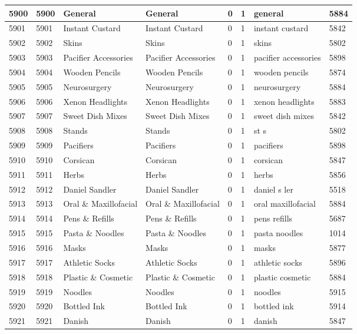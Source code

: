 \begin{longtable}{|l|l|l|l|l|l|l|l|}
5900 & 5900 & General & General & 0 & 1 & general & 5884 \\ \hline 
5901 & 5901 & Instant Custard & Instant Custard & 0 & 1 & instant custard & 5842 \\ \hline 
5902 & 5902 & Skins & Skins & 0 & 1 & skins & 5802 \\ \hline 
5903 & 5903 & Pacifier Accessories & Pacifier Accessories & 0 & 1 & pacifier accessories & 5898 \\ \hline 
5904 & 5904 & Wooden Pencils & Wooden Pencils & 0 & 1 & wooden pencils & 5874 \\ \hline 
5905 & 5905 & Neurosurgery & Neurosurgery & 0 & 1 & neurosurgery & 5884 \\ \hline 
5906 & 5906 & Xenon Headlights & Xenon Headlights & 0 & 1 & xenon headlights & 5883 \\ \hline 
5907 & 5907 & Sweet Dish Mixes & Sweet Dish Mixes & 0 & 1 & sweet dish mixes & 5842 \\ \hline 
5908 & 5908 & Stands & Stands & 0 & 1 & st s & 5802 \\ \hline 
5909 & 5909 & Pacifiers & Pacifiers & 0 & 1 & pacifiers & 5898 \\ \hline 
5910 & 5910 & Corsican & Corsican & 0 & 1 & corsican & 5847 \\ \hline 
5911 & 5911 & Herbs & Herbs & 0 & 1 & herbs & 5856 \\ \hline 
5912 & 5912 & Daniel Sandler & Daniel Sandler & 0 & 1 & daniel s ler & 5518 \\ \hline 
5913 & 5913 & Oral \& Maxillofacial & Oral \& Maxillofacial & 0 & 1 & oral maxillofacial & 5884 \\ \hline 
5914 & 5914 & Pens \& Refills & Pens \& Refills & 0 & 1 & pens refills & 5687 \\ \hline 
5915 & 5915 & Pasta \& Noodles & Pasta \& Noodles & 0 & 1 & pasta noodles & 1014 \\ \hline 
5916 & 5916 & Masks & Masks & 0 & 1 & masks & 5877 \\ \hline 
5917 & 5917 & Athletic Socks & Athletic Socks & 0 & 1 & athletic socks & 5896 \\ \hline 
5918 & 5918 & Plastic \& Cosmetic & Plastic \& Cosmetic & 0 & 1 & plastic cosmetic & 5884 \\ \hline 
5919 & 5919 & Noodles & Noodles & 0 & 1 & noodles & 5915 \\ \hline 
5920 & 5920 & Bottled Ink & Bottled Ink & 0 & 1 & bottled ink & 5914 \\ \hline 
5921 & 5921 & Danish & Danish & 0 & 1 & danish & 5847 \\ \hline 

\end{longtable}
